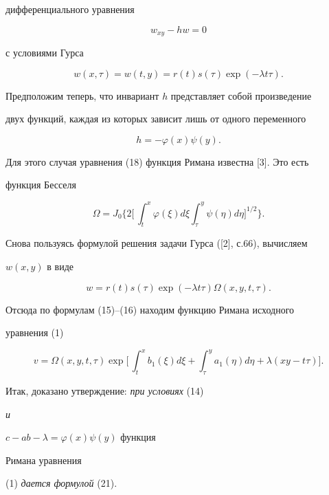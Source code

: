 дифференциального уравнения


\begin{equation}


w_{xy}-hw=0


\end{equation}


с условиями Гурса


\begin{equation}


w(x,\tau)=w(t,y)=r(t)s(\tau)\exp(-\lambda t\tau).


\end{equation}


Предположим теперь, что инвариант $h$ представляет собой произведение


двух функций, каждая из которых зависит лишь от одного переменного


\begin{equation}


h=-\varphi(x)\psi(y).


\end{equation}


Для этого случая уравнения (18) функция Римана известна [3]. Это есть


функция Бесселя


$$


\Omega=J_0\biggl\{2\biggl[\,\int^x_t \varphi(\xi)d\xi


\int^y_\tau \psi(\eta)d\eta\biggr]^{1/2}\biggr\}.


$$


Снова пользуясь формулой решения задачи Гурса ([2], с.66), вычисляем


$w(x,y)$ в виде


$$


w=r(t)s(\tau)\exp(-\lambda t\tau)\Omega(x,y,t,\tau).


$$


Отсюда по формулам (15)--(16) находим функцию Римана исходного


уравнения (1)


\begin{equation}


v=\Omega(x,y,t,\tau)\exp\biggl[\,\int^x_t b_1(\xi)d\xi+


\int^y_\tau a_1(\eta)d\eta+\lambda(xy-t\tau)\biggr].


\end{equation}





Итак, доказано утверждение: {\it при условиях} (14) {\it и


$c-ab-\lambda=\varphi(x)\psi(y)$ функция


Римана уравнения} (1) {\it дается формулой} (21).


